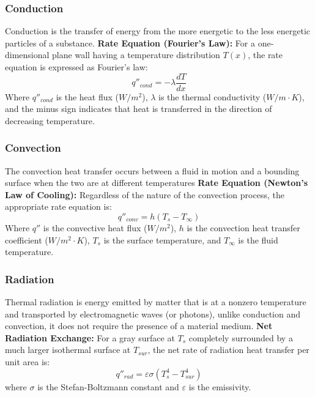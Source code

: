 \subsubsection{Conduction}
Conduction is the transfer of energy from the more energetic to the less energetic particles of a substance.
    \textbf{Rate Equation (Fourier's Law):} For a one-dimensional plane wall having a temperature distribution $T(x)$, the rate equation is expressed as Fourier's law:
    \begin{equation}
        q''_{cond} = -\lambda \frac{dT}{dx}
    \end{equation}
    Where $q''_{cond}$ is the heat flux ($W/m^2$), $\lambda$ is the thermal conductivity ($W/m \cdot K$), and the minus sign indicates that heat is transferred in the direction of decreasing temperature.

\subsubsection{Convection}
The convection heat transfer occurs between a fluid in motion and a bounding surface when the two are at different temperatures
    \textbf{Rate Equation (Newton's Law of Cooling):} Regardless of the nature of the convection process, the appropriate rate equation is:
    \begin{equation}
        q''_{conv} = h (T_s - T_\infty)
        \label{eq:convection}
    \end{equation}
    Where $q''$ is the convective heat flux ($W/m^2$), $h$ is the convection heat transfer coefficient ($W/m^2 \cdot K$), $T_s$ is the surface temperature, and $T_\infty$ is the fluid temperature.


\subsubsection{Radiation}
Thermal radiation is energy emitted by matter that is at a nonzero temperature and transported by electromagnetic waves (or photons), unlike conduction and convection, it does not require the presence of a material medium.
    \textbf{Net Radiation Exchange:} For a gray surface at $T_s$ completely surrounded by a much larger isothermal surface at $T_{sur}$, the net rate of radiation heat transfer per unit area is:
    \begin{equation}
        q''_{rad} = \varepsilon \sigma (T_s^4 - T_{sur}^4)
        \label{eq:radiation}
    \end{equation}
    where $\sigma$ is the Stefan-Boltzmann constant and $\varepsilon$ is the emissivity.


